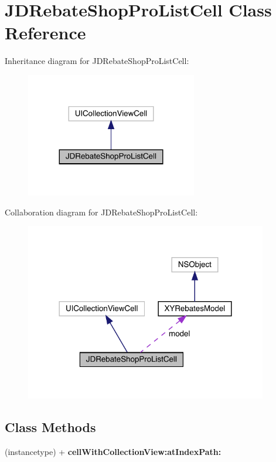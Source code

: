 \hypertarget{interface_j_d_rebate_shop_pro_list_cell}{}\section{J\+D\+Rebate\+Shop\+Pro\+List\+Cell Class Reference}
\label{interface_j_d_rebate_shop_pro_list_cell}


Inheritance diagram for J\+D\+Rebate\+Shop\+Pro\+List\+Cell\+:\nopagebreak
\begin{figure}[H]
\begin{center}
\leavevmode
\includegraphics[width=212pt]{interface_j_d_rebate_shop_pro_list_cell__inherit__graph}
\end{center}
\end{figure}


Collaboration diagram for J\+D\+Rebate\+Shop\+Pro\+List\+Cell\+:\nopagebreak
\begin{figure}[H]
\begin{center}
\leavevmode
\includegraphics[width=300pt]{interface_j_d_rebate_shop_pro_list_cell__coll__graph}
\end{center}
\end{figure}
\subsection*{Class Methods}
\begin{DoxyCompactItemize}
\item 
\mbox{\label{interface_j_d_rebate_shop_pro_list_cell_a813ff79013d72b7e2c6f8c0f2e9dc25f}} 
(instancetype) + {\bfseries cell\+With\+Collection\+View\+:at\+Index\+Path\+:}
\end{DoxyCompactItemize}
